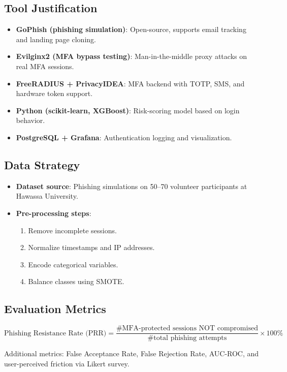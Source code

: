 \documentclass[11pt]{article}
\begin{document}
\subsection{Tool Justification}
\begin{itemize}
    \item \textbf{GoPhish (phishing simulation)}: Open-source, supports email tracking and landing page cloning.
    \item \textbf{Evilginx2 (MFA bypass testing)}: Man-in-the-middle proxy attacks on real MFA sessions.
    \item \textbf{FreeRADIUS + PrivacyIDEA}: MFA backend with TOTP, SMS, and hardware token support.
    \item \textbf{Python (scikit-learn, XGBoost)}: Risk-scoring model based on login behavior.
    \item \textbf{PostgreSQL + Grafana}: Authentication logging and visualization.
\end{itemize}

\subsection{Data Strategy}
\begin{itemize}
    \item \textbf{Dataset source}: Phishing simulations on 50--70 volunteer participants at Hawassa University.
    \item \textbf{Pre-processing steps}:
    \begin{enumerate}
        \item Remove incomplete sessions.
        \item Normalize timestamps and IP addresses.
        \item Encode categorical variables.
        \item Balance classes using SMOTE.
    \end{enumerate}
\end{itemize}

\subsection{Evaluation Metrics}
\begin{equation}
\text{Phishing Resistance Rate (PRR)} = \frac{\text{\# MFA-protected sessions NOT compromised}}{\text{\# total phishing attempts}} \times 100\%
\end{equation}

Additional metrics: False Acceptance Rate, False Rejection Rate, AUC-ROC, and user-perceived friction via Likert survey.
\end{document}
